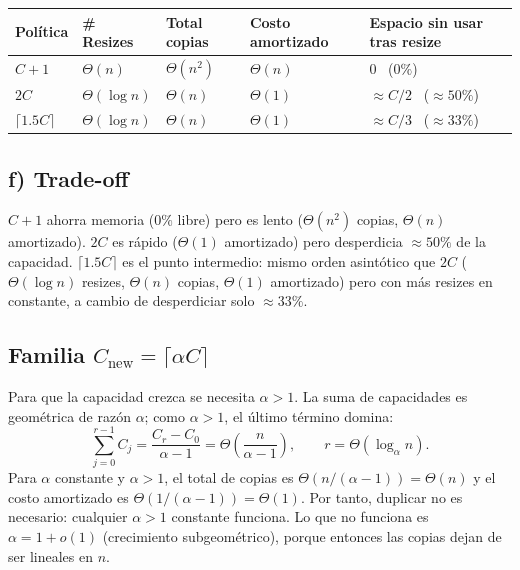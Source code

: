 \documentclass[11pt,a4paper]{article}
\begin{document}
\renewcommand{\arraystretch}{1.4}
{\setlength{\tabcolsep}{4pt}
\begin{center}
\small
\begin{tabular}{@{}L{1.7cm}L{2.1cm}L{2cm}L{2.4cm}L{2.8cm}@{}}
\toprule
Política & \# Resizes & Total copias & Costo amortizado & Espacio sin usar tras resize \\
\midrule
$C+1$              & $\Theta(n)$      & $\Theta(n^2)$ & $\Theta(n)$ & $0$ \ ($0\%$) \\
$2C$               & $\Theta(\log n)$ & $\Theta(n)$   & $\Theta(1)$ & $\approx C/2$ \ ($\approx 50\%$) \\
$\lceil 1.5C\rceil$ & $\Theta(\log n)$ & $\Theta(n)$   & $\Theta(1)$ & $\approx C/3$ \ ($\approx 33\%$) \\
\bottomrule
\end{tabular}
\end{center}}
\renewcommand{\arraystretch}{1}

\subsection*{f) Trade-off}

$C+1$ ahorra memoria ($0\%$ libre) pero es lento ($\Theta(n^2)$ copias, $\Theta(n)$ amortizado). $2C$ es rápido ($\Theta(1)$ amortizado) pero desperdicia $\approx 50\%$ de la capacidad. $\lceil 1.5C\rceil$ es el punto intermedio: mismo orden asintótico que $2C$ ($\Theta(\log n)$ resizes, $\Theta(n)$ copias, $\Theta(1)$ amortizado) pero con más resizes en constante, a cambio de desperdiciar solo $\approx 33\%$.

\subsection*{Familia $C_{\text{new}} = \lceil \alpha C \rceil$}

Para que la capacidad crezca se necesita $\alpha > 1$. La suma de capacidades es geométrica de razón $\alpha$; como $\alpha > 1$, el último término domina:
\[
\sum_{j=0}^{r-1} C_j = \frac{C_r - C_0}{\alpha - 1} = \Theta\!\left(\frac{n}{\alpha - 1}\right),
\qquad r = \Theta(\log_\alpha n).
\]
Para $\alpha$ constante y $\alpha > 1$, el total de copias es $\Theta(n/(\alpha-1)) = \Theta(n)$ y el costo amortizado es $\Theta(1/(\alpha-1)) = \Theta(1)$. Por tanto, duplicar no es necesario: cualquier $\alpha > 1$ constante funciona. Lo que no funciona es $\alpha = 1 + o(1)$ (crecimiento subgeométrico), porque entonces las copias dejan de ser lineales en $n$.
\end{document}
